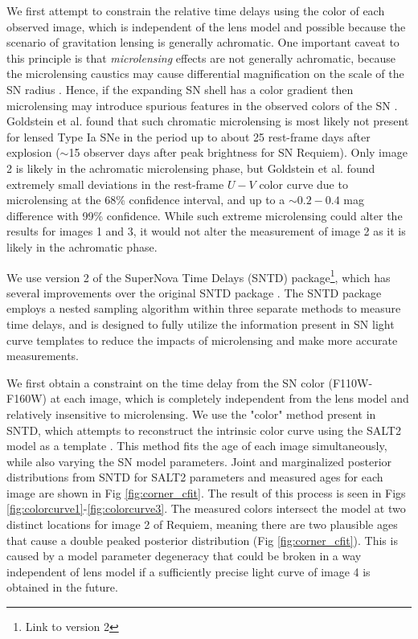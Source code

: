 \documentclass[12pt,dvipsnames]{article}
\def\SNABC{SN Requiem\xspace}
\begin{document}
We first attempt to constrain the relative time delays using the color of each observed image, which is independent of the lens model and possible because the scenario of gravitation lensing is generally achromatic. One important caveat to this principle is that {\it microlensing} effects are not generally achromatic, because the microlensing caustics may cause differential magnification on the scale of the SN radius \cite{goldstein_precise_2018,foxley-marrable_impact_2018,bonvin_impact_2019}.  Hence, if the expanding SN shell has a color gradient then microlensing may introduce spurious features in the observed colors of the SN \cite{kochanek_quantitative_2004,vernardos_joint_2018}.   Goldstein et al. \cite{goldstein_precise_2018} found that such chromatic microlensing is most likely not present for lensed Type Ia SNe in the period up to about 25 rest-frame days after explosion ($\sim$15 observer days after peak brightness for \SNABC). Only image 2 is likely in the achromatic microlensing phase, but Goldstein et al. \cite{goldstein_precise_2018} found extremely small deviations in the rest-frame $U-V$ color curve due to microlensing at the 68\% confidence interval, and up to a $\sim0.2-0.4$ mag difference with 99\% confidence. While such extreme microlensing could alter the results for images 1 and 3, it would not alter the measurement of image 2 as it is likely in the achromatic phase.

We use version 2 of the SuperNova Time Delays (SNTD) package\footnote{Link to version 2}, which has several improvements over the original SNTD package \cite{pierel_turning_2019}. The SNTD package employs a nested sampling algorithm within three separate methods to measure time delays, and is designed to fully utilize the information present in SN light curve templates \cite{hsiao_k_2007,guy_salt2:_2007,kessler_results_2010,pierel_extending_2018} to reduce the impacts of microlensing and make more accurate measurements. 

We first obtain a constraint on the time delay from the SN color (F110W-F160W) at each image, which is completely independent from the lens model and relatively insensitive to microlensing. We use the "color" method present in SNTD, which attempts to reconstruct the intrinsic color curve using the SALT2 model as a template \cite{guy_salt2:_2007}. This method fits the age of each image simultaneously, while also varying the SN model parameters. Joint and marginalized posterior distributions
from SNTD for SALT2 parameters and measured ages for each image are shown in Fig \ref{fig:corner_cfit}. The result of this process is seen in Figs \ref{fig:colorcurve1}-\ref{fig:colorcurve3}. The measured colors intersect the model at two distinct locations for image 2 of Requiem, meaning there are two plausible ages that cause a double peaked posterior distribution (Fig \ref{fig:corner_cfit}). This is caused by a model parameter degeneracy that could be broken in a way independent of lens model if a sufficiently precise light curve of image 4 is obtained in the future.
\end{document}
